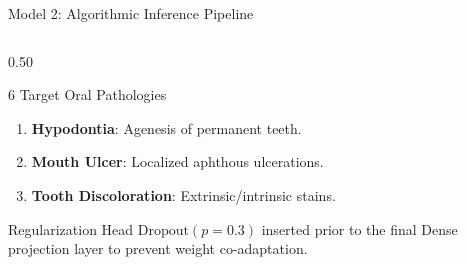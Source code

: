 \documentclass[aspectratio=169, 10pt]{beamer}
\begin{document}
\begin{frame}{Model 2: Algorithmic Inference Pipeline}
\begin{columns}[T]
\begin{column}{0.50\textwidth}
\begin{block}{6 Target Oral Pathologies}
\begin{enumerate}
                \item \textbf{Hypodontia}: Agenesis of permanent teeth.
                \item \textbf{Mouth Ulcer}: Localized aphthous ulcerations.
                \item \textbf{Tooth Discoloration}: Extrinsic/intrinsic stains.
            \end{enumerate}
        \end{block}
        \begin{exampleblock}{Regularization Head}
            \footnotesize $\text{Dropout}(p=0.3)$ inserted prior to the final Dense projection layer to prevent weight co-adaptation.
        \end{exampleblock}
    \end{column}
\end{columns}
\end{frame}
\end{document}
